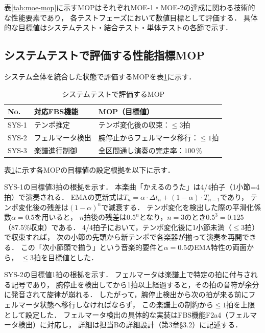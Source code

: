 \documentclass[lualatex,book,paper=a4paper,jafontsize=11.5pt,jafontscale=1.05,oneside]{jlreq}
\begin{document}
表\ref{tab:moe-mop}に示すMOPはそれぞれMOE-1・MOE-2の達成に関わる技術的な性能要素であり，
各テストフェーズにおいて数値目標として評価する．
具体的な目標値はシステムテスト・結合テスト・単体テストの各節で示す．

\subsection{システムテストで評価する性能指標MOP}

システム全体を統合した状態で評価するMOPを表\ref{tab:mop-sys}に示す．

\begin{table}[H]
  \centering
  \caption{システムテストで評価するMOP}
  \label{tab:mop-sys}
  \begin{tabularx}{\linewidth}{llX}
    \toprule
    No. & 対応FBS機能 & MOP（目標値） \\
    \midrule
    SYS-1 & テンポ推定 &
      テンポ変化後の収束：$\leq 3$拍 \\
    SYS-2 & フェルマータ検出 &
      腕停止からフェルマータ移行：$\leq 1$拍 \\
    SYS-3 & 楽譜進行制御 &
      全区間通し演奏の完走率：$100\,\%$ \\
    \bottomrule
  \end{tabularx}
\end{table}

表\ref{tab:mop-sys}に示す各MOPの目標値の設定根拠を以下に示す．

SYS-1の目標値3拍の根拠を示す．
本楽曲「かえるのうた」は4/4拍子（1小節=4拍）で演奏される．
EMAの更新式は$T_n = \alpha \cdot \Delta t_n + (1-\alpha)\cdot T_{n-1}$であり，
テンポ変化後の残差は$(1-\alpha)^n$で減衰する．
テンポ変化を検出した際の平滑化係数$\alpha=0.5$を用いると，
$n$拍後の残差は$0.5^n$となり，$n=3$のとき$0.5^3=0.125$（87.5\%収束）である．
4/4拍子において，テンポ変化後に1小節未満（$\leq 3$拍）で収束すれば，
次の小節の先頭から新テンポで各楽器が揃って演奏を再開できる．
この「次小節頭で揃う」という音楽的要件と$\alpha=0.5$のEMA特性の両面から，
$\leq 3$拍を目標値とした．

SYS-2の目標値1拍の根拠を示す．
フェルマータは楽譜上で特定の拍に付与される記号であり，
腕停止を検出してから1拍以上経過すると，その拍の音符が余分に発音されて旋律が崩れる．
したがって，腕停止検出から次の拍が来る前にフェルマータ状態へ移行しなければならず，
この楽譜上の制約から$\leq 1$拍を上限として設定した．
フェルマータ検出の具体的な実装はFBS機能F2a4（フェルマータ検出）に対応し，
詳細は担当Bの詳細設計（第3章§3.2）に記述する．
\end{document}
